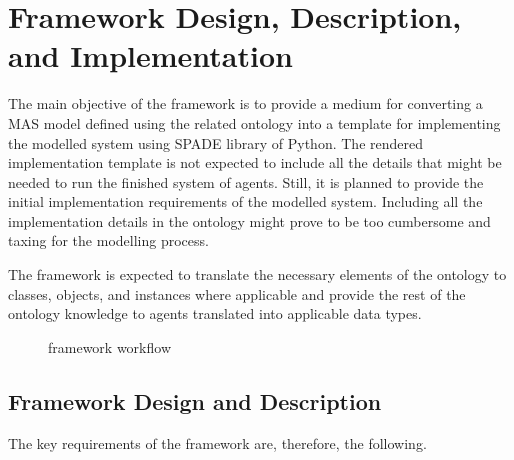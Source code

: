 \chapter{Framework Design, Description, and Implementation}\label{ch: Framework Design}


The main objective of the \magoontologyname framework
is to provide a medium for converting a \ac{MAS} model defined using the related \magoontologyname ontology into a template for implementing the modelled system using \ac{SPADE} library of Python. The rendered implementation template is not expected to include all the details that might be needed to run the finished system of agents. Still, it is planned to provide the initial implementation requirements of the modelled system. Including all the implementation details in the ontology might prove to be too cumbersome and taxing for the modelling process.

The framework is expected to translate the necessary elements of the ontology to classes, objects, and instances where applicable and provide the rest of the ontology knowledge to agents translated into applicable data types.

\begin{figure}
    \centering
    
    \caption{\magoontologyname framework workflow}
    \label{fig: ontology framework template}
\end{figure}



\section{Framework Design and Description}

The key requirements of the framework are, therefore, the following.

